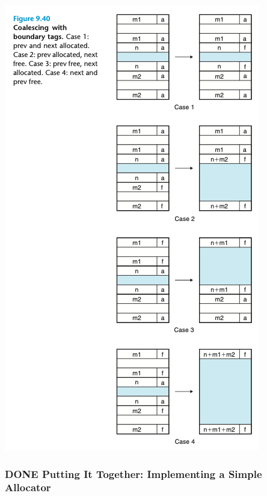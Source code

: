 \documentclass[11pt]{article}
\begin{document}
\begin{center}
\includegraphics[width=.9\linewidth]{pics/figure9.40-coalescing.png}
\end{center}

\subsubsection{{\bfseries\sffamily DONE} Putting It Together: Implementing a Simple Allocator}
\label{sec:orga5073d4}
\end{document}
